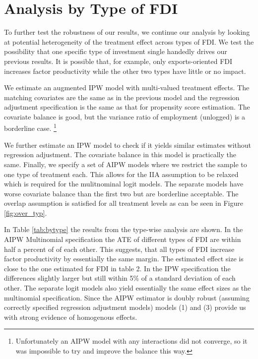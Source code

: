 \documentclass[a4paper,11pt]{scrartcl}
\begin{document}
\section{Analysis by Type of FDI}

To further test the robustness of our results, we continue our analysis by looking at potential heterogeneity of the treatment effect across types of FDI. %
We test the possibility that one specific type of investment single handedly drives our previous results. It is possible that, for example, only exports-oriented FDI increases factor productivity while the other two types have little or no impact. 

We estimate an augmented IPW model with multi-valued treatment effects. The matching covariates are the same as in the previous model and the regression adjustment specification is the same as that for propensity score estimation. The covariate balance is good, but the variance ratio of employment (unlogged) is a borderline case. \footnote{Unfortunately an AIPW model with any interactions did not converge, so it was impossible to try and improve the balance this way.}%

We further estimate an IPW model to check if it yields similar estimates without regression adjustment. The covariate balance in this model is practically the same. Finally, we specify a set of AIPW models where we restrict the sample to one type of treatment each. This allows for the IIA assumption to be relaxed which is required for the mulitnominal logit models. The separate models have worse covariate balance than the first two but are borderline acceptable. The overlap assumption is satisfied for all treatment levels as can be seen in Figure \ref{fig:over_typ}. 


In Table \ref{tab:bytype} the results from the type-wise analysis are shown. In the AIPW Multinomial specification the ATE of different types of FDI are within half a percent of of each other. This suggests, that all types of FDI increase factor productivity by essentially the same margin. The estimated effect size is close to the one estimated for FDI in table 2. In the IPW specification the differences slightly larger but still within 5\% of a standard deviation of each other.  The separate logit models also yield essentially the same effect sizes as the multinomial specification. Since the AIPW estimator is doubly robust (assuming correctly specified regression adjustment models) models (1) and (3) provide us with strong evidence of homogenous effects.
\end{document}
